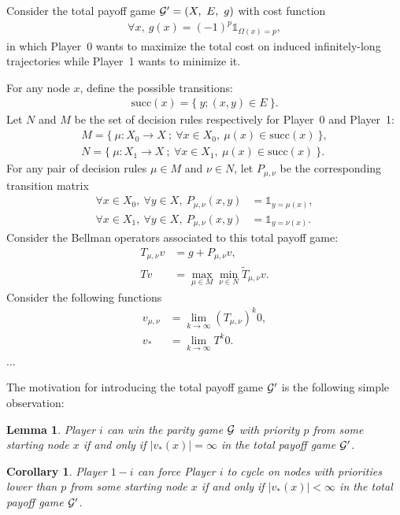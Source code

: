 \documentclass{article}
\newtheorem{lemma}{Lemma}
\newtheorem{corollary}{Corollary}
\def\1{{\mathds 1}}
\def\G{{\cal G}}
\def\pa{Player~0}
\def\pb{Player~1}
\def\suc{\mbox{succ}}
\begin{document}
Consider the total payoff game $\G'=(X,~ E,~ g)$ with cost function
\begin{align}
  \forall x,~ g(x) = (-1)^p \1_{\Omega(x)=p},
\end{align}
in which \pa{ }wants to maximize the total cost on induced infinitely-long trajectories while \pb{ }wants to minimize it.

For any node $x$, define the possible transitions:
\begin{align}
  \suc(x) = \{ ~y ; (x,y) \in E ~\}.
\end{align}
Let $N$ and $M$ be the set of decision rules respectively for \pa{ }and \pb:
\begin{align}
  M = \{~ \mu:X_0 \to X ~;~ \forall x \in X_0,~ \mu(x) \in \suc(x) ~\},\\
  N = \{~ \mu:X_1 \to X ~;~ \forall x \in X_1,~ \mu(x) \in \suc(x) ~\}.
\end{align}
For any pair of decision rules $\mu \in M$ and $\nu \in N$, let $P_{\mu,\nu}$ be the corresponding transition matrix
\begin{align}
  \forall x \in X_0,~ \forall y \in X,~ P_{\mu,\nu}(x,y) &= \1_{y=\mu(x)}, \\
  \forall x \in X_1,~ \forall y \in X,~ P_{\mu,\nu}(x,y) &= \1_{y=\nu(x)}.
\end{align}
Consider the Bellman operators associated to this total payoff game:
\begin{align}
  T_{\mu,\nu}v &= g + P_{\mu,\nu}v,\\
  T v & = \max_{\mu \in M} \min_{\nu \in N}\tilde T_{\mu,\nu}v.
\end{align}
Consider the following functions
\begin{align}
  v_{\mu,\nu} &= \lim_{k \to \infty}(T_{\mu,\nu})^k0, \\
  v_* &= \lim_{k \to \infty}T^k0.
\end{align}
...

The motivation for introducing the total payoff game $\G'$ is the following simple observation:
\begin{lemma}
  Player $i$ can win the parity game $\G$ with priority $p$ from some starting node $x$ if and only if $|v_*(x)|=\infty$ in the total payoff game $\G'$.
\end{lemma}
\begin{corollary}
  Player $1-i$ can force Player $i$ to cycle on nodes with priorities lower than $p$ from some starting node $x$ if and only if $|v_*(x)|<\infty$ in the total payoff game $\G'$.
\end{corollary}
\end{document}
